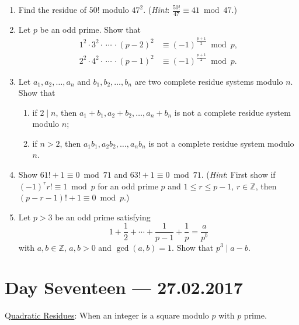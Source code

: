 \documentclass{amsbook}
\theoremstyle{plain}
\theoremstyle{definition}
\theoremstyle{remark}
\numberwithin{equation}{chapter}
\numberwithin{figure}{chapter}
\newcommand{\Z}{\mathbb{Z}}
\begin{document}
\begin{enumerate}
\item Find the residue of $50!$ modulo $47^2$. (\emph{Hint}: $\frac{50!}{47} \equiv 41 \bmod 47$.)
\item Let $p$ be an odd prime. Show that
  \begin{align}
    1^2 \cdot 3^2 \cdot \, \cdots \, \cdot (p-2)^2 &\equiv (-1)^{\frac{p+1}2} \bmod p, \\
    2^2 \cdot 4^2 \cdot \, \cdots \, \cdot (p-1)^2 &\equiv (-1)^{\frac{p+1}2} \bmod p.
  \end{align}
\item Let $a_1, a_2, \ldots, a_n$ and $b_1, b_2, \ldots, b_n$ are two complete residue systems modulo $n$. Show that
  \begin{enumerate}
  \item if $2 \mid n$, then $a_1 + b_1, a_2 + b_2, \ldots, a_n + b_n$ is not a complete residue system modulo $n$;
  \item if $n > 2$, then $a_1 b_1, a_2 b_2, \ldots, a_n b_n$ is not a complete residue system modulo $n$.
  \end{enumerate}
\item Show $61! + 1 \equiv 0 \bmod 71$ and $63! + 1 \equiv 0 \bmod 71$. (\emph{Hint}: First show if $(-1)^r r! \equiv 1 \bmod p$ for an odd prime $p$ and $1 \leqslant r \leqslant p - 1$, $r \in \Z$, then $(p - r - 1)! + 1 \equiv 0 \bmod p$.) 
\item Let $p > 3$ be an odd prime satisfying
  \[
    1 + \frac{1}2 + \cdots + \frac{1}{p - 1} + \frac{1}p = \frac{a}{p^b}
  \]
  with $a,b \in \Z$, $a, b > 0$ and $\gcd (a, b) = 1$. Show that $p^3 \mid a - b$.
\end{enumerate}
\chapter[Lecture Seventeen]{Day Seventeen \hfill {\footnotesize \rm --- 27.02.2017}}

Q\underline{uadratic Residues}: When an integer is a square modulo $p$ with $p$ prime.
\end{document}

